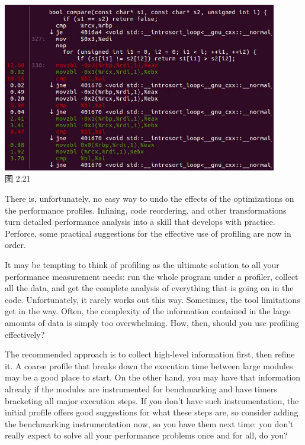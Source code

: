 \begin{center}
\includegraphics[width=0.9\textwidth]{content/1/chapter2/images/21.jpg}\\
图 2.21
\end{center}

There is, unfortunately, no easy way to undo the effects of the optimizations on the performance profiles. Inlining, code reordering, and other transformations turn detailed performance analysis into a skill that develops with practice. Perforce, some practical suggestions for the effective use of profiling are now in order.


It may be tempting to think of profiling as the ultimate solution to all your performance measurement needs: run the whole program under a profiler, collect all the data, and get the complete analysis of everything that is going on in the code. Unfortunately, it rarely works out this way. Sometimes, the tool limitations get in the way. Often, the complexity of the information contained in the large amounts of data is simply too overwhelming. How, then, should you use profiling effectively?

The recommended approach is to collect high-level information first, then refine it. A coarse profile that breaks down the execution time between large modules may be a good place to start. On the other hand, you may have that information already if the modules are instrumented for benchmarking and have timers bracketing all major execution steps. If you don't have such instrumentation, the initial profile offers good suggestions for what these steps are, so consider adding the benchmarking instrumentation now, so you have them next time: you don't really expect to solve all your performance problems once and for all, do you?

